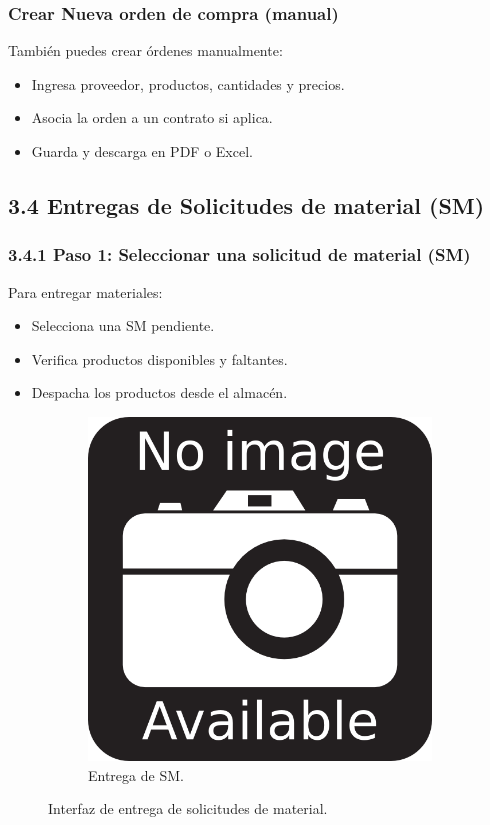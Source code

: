 \subsubsection{Crear Nueva orden de compra (manual)}

También puedes crear órdenes manualmente:

\begin{itemize}
    \item Ingresa proveedor, productos, cantidades y precios.
    \item Asocia la orden a un contrato si aplica.
    \item Guarda y descarga en PDF o Excel.
\end{itemize}

\subsection{3.4 Entregas de Solicitudes de material (SM)}

\subsubsection{3.4.1 Paso 1: Seleccionar una solicitud de material (SM)}

Para entregar materiales:

\begin{itemize}
    \item Selecciona una SM pendiente.
    \item Verifica productos disponibles y faltantes.
    \item Despacha los productos desde el almacén.
\end{itemize}

\begin{figure}[h]
\centering
\begin{subfigure}{0.4\textwidth}
    \includegraphics[width=\textwidth]{imgs/no-image.png}
    \caption{Entrega de SM.}
    \label{fig:admin5}
\end{subfigure}
\caption{Interfaz de entrega de solicitudes de material.}
\end{figure}
